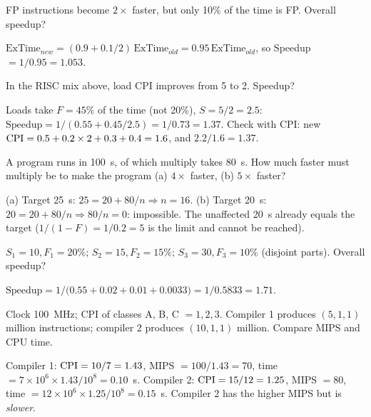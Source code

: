 \begin{exercise}
FP instructions become $2\times$ faster, but only 10\% of the time is FP.
Overall speedup?
\end{exercise}
\begin{solution}
$\text{ExTime}_{new} = (0.9 + 0.1/2)\,\text{ExTime}_{old} =
0.95\,\text{ExTime}_{old}$, so Speedup $=1/0.95 = 1.053$.
\end{solution}

\begin{exercise}
In the RISC mix above, load CPI improves from 5 to 2. Speedup?
\end{exercise}
\begin{solution}
Loads take $F=45\%$ of the time (not 20\%), $S=5/2=2.5$:
$\text{Speedup}=1/(0.55+0.45/2.5) = 1/0.73 = 1.37$.
Check with CPI: new $\mathrm{CPI} = 0.5+0.2\times2+0.3+0.4 = 1.6$, and
$2.2/1.6 = 1.37$.
\end{solution}

\begin{exercise}
A program runs in 100~s, of which multiply takes 80~s. How much faster must
multiply be to make the program (a) $4\times$ faster, (b) $5\times$ faster?
\end{exercise}
\begin{solution}
(a) Target 25~s: $25 = 20 + 80/n \Rightarrow n = 16$.
(b) Target 20~s: $20 = 20 + 80/n \Rightarrow 80/n = 0$: impossible. The
unaffected 20~s already equals the target ($1/(1-F) = 1/0.2 = 5$ is the
limit and cannot be reached).
\end{solution}

\begin{exercise}
$S_1=10, F_1=20\%$; $S_2=15, F_2=15\%$; $S_3=30, F_3=10\%$ (disjoint
parts). Overall speedup?
\end{exercise}
\begin{solution}
$\text{Speedup} = 1/\big(0.55 + 0.02 + 0.01 + 0.0033\big) = 1/0.5833 =
1.71$.
\end{solution}

\begin{exercise}
Clock 100~MHz; CPI of classes A, B, C $=1,2,3$. Compiler 1 produces
$(5,1,1)$ million instructions; compiler 2 produces $(10,1,1)$ million.
Compare MIPS and CPU time.
\end{exercise}
\begin{solution}
Compiler 1: $\mathrm{CPI} = 10/7 = 1.43$, MIPS $=100/1.43 = 70$, time
$=7\times10^6\times1.43/10^8 = 0.10$~s.
Compiler 2: $\mathrm{CPI} = 15/12 = 1.25$, MIPS $= 80$, time
$=12\times10^6\times1.25/10^8 = 0.15$~s.
Compiler 2 has the higher MIPS but is \emph{slower}.
\end{solution}

